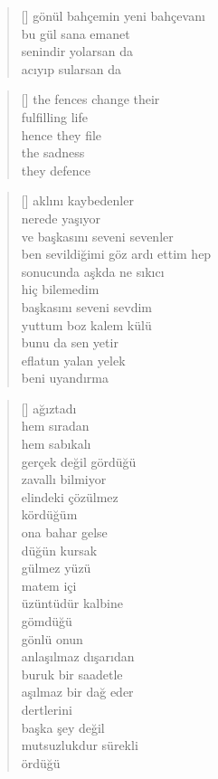 \documentclass[a5paper, openright, twoside]{memoir}
\begin{document}
\begin{verse}[\versewidth]
  gönül bahçemin yeni bahçevanı \\
  bu gül sana emanet \\
  senindir yolarsan da \\
  acıyıp sularsan da \\
\end{verse}
\begin{verse}[\versewidth]
  the fences change their \\
  fulfilling life \\
  hence they file \\
  the sadness \\
  they defence \\
\end{verse}
\begin{verse}[\versewidth]
  aklını kaybedenler \\
  nerede yaşıyor \\
  ve başkasını seveni sevenler \\
  ben sevildiğimi göz ardı ettim hep \\
  sonucunda aşkda ne sıkıcı \\
  hiç bilemedim \\
  başkasını seveni sevdim \\
  yuttum boz kalem külü \\
  bunu da sen yetir \\
  eflatun yalan yelek \\
  beni uyandırma \\
\end{verse}
\begin{verse}[\versewidth]
  ağıztadı \\
  hem sıradan \\
  hem sabıkalı \\
  gerçek değil gördüğü \\
  zavallı bilmiyor \\
  elindeki çözülmez \\
  kördüğüm \\
  ona bahar gelse \\
  düğün kursak \\
  gülmez yüzü \\
  matem içi \\
  üzüntüdür kalbine \\
  gömdüğü \\
  gönlü onun \\
  anlaşılmaz dışarıdan \\
  buruk bir saadetle \\
  aşılmaz bir dağ eder \\
  dertlerini \\
  başka şey değil \\
  mutsuzlukdur sürekli \\
  ördüğü \\
\end{verse}
\end{document}
